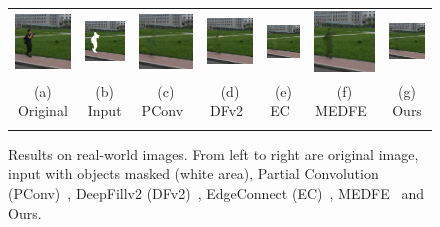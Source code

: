 \documentclass[10pt,journal,compsoc]{IEEEtran}
\begin{document}
\begin{figure}[hbt]
\begin{tabular}{ccccccc}
		\includegraphics[width=.135\textwidth]{Object-Removal/GT41-0}  &
		\includegraphics[width=.135\textwidth]{Object-Removal/input41-0}  &
		\includegraphics[width=.135\textwidth]{Object-Removal/pconv41-0}  &
		\includegraphics[width=.135\textwidth]{Object-Removal/gc41-0}  &
		\includegraphics[width=.135\textwidth]{Object-Removal/ec41-0}  &
		\includegraphics[width=.135\textwidth]{Object-Removal/MEDFE1-0}  &
		\includegraphics[width=.135\textwidth]{Object-Removal/ours41-0}  \\
		\scriptsize{(a) Original} & \scriptsize{(b) Input} &\scriptsize{(c) PConv~\cite{partialconv2017}} &\scriptsize{(d) DFv2~\cite{yu2018free}} &\scriptsize{(e) EC~\cite{nazeri2019edgeconnect}}&\scriptsize{(f) MEDFE~\cite{liu2020rethinking}}& \scriptsize{(g) Ours} \\
		\vspace{-2mm}
	\end{tabular}
	\caption{Results on real-world images. From left to right are original image, input with objects masked (white area), Partial Convolution (PConv)~\cite{partialconv2017}, DeepFillv2 (DFv2)~\cite{yu2018free}, EdgeConnect (EC)~\cite{nazeri2019edgeconnect}, MEDFE~\cite{liu2020rethinking} and Ours.}
	\label{fig:real}
\end{figure}
\end{document}
